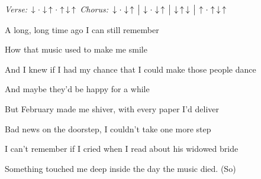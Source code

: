 \begin{song}


\begin{headerbox}
\textit{Verse:} $\Down\Miss\Down\Up\Miss\Up\Down\Up$ \quad
\textit{Chorus:} $\Down\Miss\Down\Up \Separator \Down\Miss\Down\Up \Separator \Down\Up\Down \Separator \Up\Miss\Up\Down\Up$ \quad
\end{headerbox}

\begin{chordbox}
 \par
{} \par
{} \par
{} \par
{} \par
{} \par
{} \par
{} \par
\end{chordbox}

\normalsize

\bigskip

 \par
A long, long time ago  I can still remember \par
How that music used to make me smile \par
And I knew if I had my chance that I could make those people dance \par
And maybe they'd be happy for a while \par

\bigskip

But February made me shiver, with every paper I'd deliver \par
{}Bad news on the doorstep, I couldn't take one more step \par
I can't remember if I cried when I read about his widowed bride \par
{}Something touched me deep inside the day the music died. (So) \par

\bigskip


\end{song}

